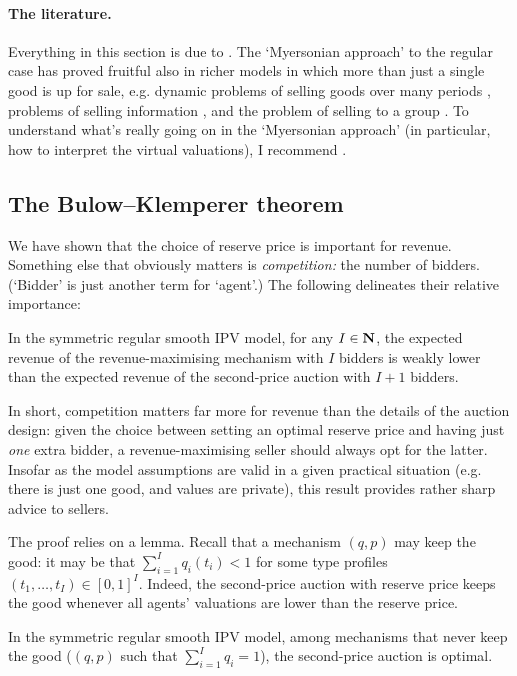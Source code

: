 \paragraph{The literature.}
Everything in this section is due to \textcite{Myerson1981}.
The `Myersonian approach' to the regular case has proved fruitful also in richer models in which more than just a single good is up for sale,
e.g. dynamic problems of selling goods over many periods \parencite{PavanSegalToikka2014}, problems of selling information \parencite{Yang2022}, and the problem of selling to a group \parencite{HaghpanahKuvalekarLipnowski2022}.
To understand what's really going on in the `Myersonian approach' (in particular, how to interpret the virtual valuations), I recommend \textcite[section~3.3]{Hartline2016}.



\subsection{The Bulow--Klemperer theorem}
\label{sec:ch2:bulow-klemperer}

We have shown that the choice of reserve price is important for revenue.
Something else that obviously matters is \emph{competition:} the number of bidders. (`Bidder' is just another term for `agent'.)
The following delineates their relative importance:

\begin{namedthm}
	\label{theorem:BulowKlemperer}
	In the symmetric regular smooth IPV model,
	for any $I \in \mathbf{N}$,
	the expected revenue of the revenue-maximising mechanism with $I$ bidders
	is weakly lower than the expected revenue of the second-price auction with $I+1$ bidders.
\end{namedthm}

In short, competition matters far more for revenue than the details of the auction design:
given the choice between setting an optimal reserve price
and having just \emph{one} extra bidder,
a revenue-maximising seller should always opt for the latter.
Insofar as the model assumptions are valid in a given practical situation (e.g. there is just one good, and values are private), this result provides rather sharp advice to sellers.


The proof relies on a lemma.
Recall that a mechanism $(q,p)$ may keep the good:
it may be that $\sum_{i=1}^I q_i(t_i) < 1$ for some type profiles $(t_1,\dots,t_I) \in [0,1]^I$.
Indeed, the second-price auction with reserve price keeps the good whenever all agents' valuations are lower than the reserve price.
%
\begin{lemma}
	\label{lemma:MyersonMustallocate}
	In the symmetric regular smooth IPV model,
	among mechanisms that never keep the good
	($(q,p)$ such that $\sum_{i=1}^I q_i = 1$),
	the second-price auction
	is optimal.
\end{lemma}

